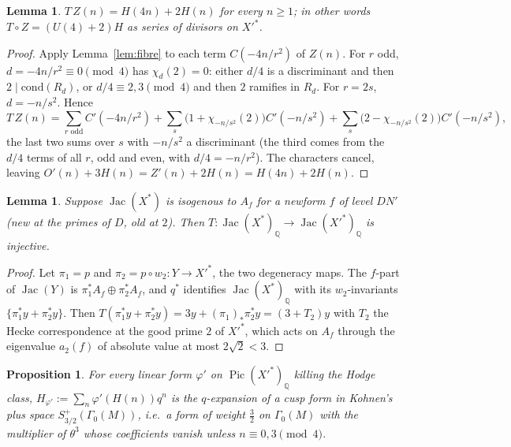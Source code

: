 \documentclass[11pt,reqno]{amsart}
\theoremstyle{plain}
\newtheorem{proposition}[theorem]{Proposition}
\newtheorem{lemma}[theorem]{Lemma}
\theoremstyle{definition}
\DeclareMathOperator{\Jac}{Jac}
\DeclareMathOperator{\Pic}{Pic}
\newcommand{\Q}{\mathbb{Q}}
\begin{document}
\begin{lemma}\label{lem:series}
$T\,Z(n)=H(4n)+2H(n)$ for every $n\ge1$; in other words $T\circ Z=(U(4)+2)H$ as series of divisors
on $X'^*$.
\end{lemma}

\begin{proof}
Apply Lemma~\ref{lem:fibre} to each term $C(-4n/r^2)$ of $Z(n)$. For $r$ odd, $d=-4n/r^2\equiv0\pmod4$
has $\chi_d(2)=0$: either $d/4$ is a discriminant and then $2\mid\text{cond}(R_d)$, or
$d/4\equiv2,3\pmod4$ and then $2$ ramifies in $R_d$. For $r=2s$, $d=-n/s^2$. Hence
\[
T\,Z(n)=\sum_{r\text{ odd}}C'(-4n/r^2)+\sum_{s}\bigl(1+\chi_{-n/s^2}(2)\bigr)C'(-n/s^2)
+\sum_{s}\bigl(2-\chi_{-n/s^2}(2)\bigr)C'(-n/s^2),
\]
the last two sums over $s$ with $-n/s^2$ a discriminant (the third comes from the $d/4$ terms of
all $r$, odd and even, with $d/4=-n/r^2$). The characters cancel, leaving $O'(n)+3H(n)=Z'(n)+2H(n)=H(4n)+2H(n)$.
\end{proof}

\begin{lemma}\label{lem:inj}
Suppose $\Jac(X^*)$ is isogenous to $A_f$ for a newform $f$ of level $DN'$ (new at the primes of
$D$, old at $2$). Then $T:\Jac(X^*)_\Q\to\Jac(X'^*)_\Q$ is injective.
\end{lemma}

\begin{proof}
Let $\pi_1=p$ and $\pi_2=p\circ w_2:Y\to X'^*$, the two degeneracy maps. The $f$-part of $\Jac(Y)$ is
$\pi_1^*A_f\oplus\pi_2^*A_f$, and $q^*$ identifies $\Jac(X^*)_\Q$ with its $w_2$-invariants
$\{\pi_1^*y+\pi_2^*y\}$. Then $T(\pi_1^*y+\pi_2^*y)=3y+(\pi_1)_*\pi_2^*y=(3+T_2)y$ with $T_2$ the
Hecke correspondence at the good prime $2$ of $X'^*$, which acts on $A_f$ through the eigenvalue
$a_2(f)$ of absolute value at most $2\sqrt2<3$.
\end{proof}

\begin{proposition}\label{prop:plus}
For every linear form $\varphi'$ on $\Pic(X'^*)_\Q$ killing the Hodge class, $H_{\varphi'}:=\sum_n\varphi'(H(n))q^n$
is the $q$-expansion of a cusp form in Kohnen's plus space $S^+_{3/2}(\Gamma_0(M))$, i.e.\ a form
of weight $\tfrac32$ on $\Gamma_0(M)$ with the multiplier of $\theta^3$ whose coefficients vanish
unless $n\equiv0,3\pmod4$.
\end{proposition}
\end{document}
